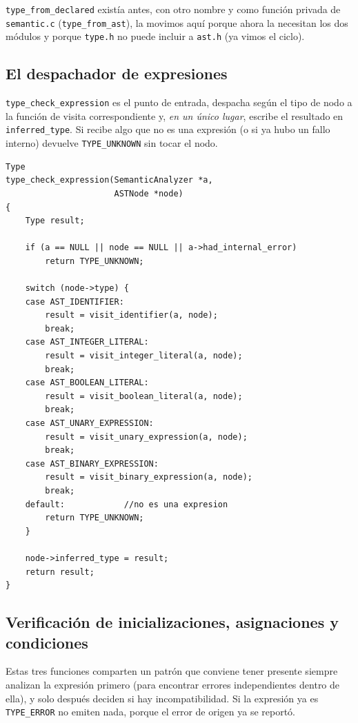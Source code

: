 \documentclass[12pt,letterpaper]{article}
\begin{document}
\bigskip

\texttt{type\_from\_declared} existía antes, con otro nombre y como función privada de \texttt{semantic.c}
(\texttt{type\_from\_ast}), la movimos aquí porque ahora la necesitan los dos módulos y porque \texttt{type.h}
no puede incluir a \texttt{ast.h} (ya vimos el ciclo).

\subsection*{El despachador de expresiones}

\texttt{type\_check\_expression} es el punto de entrada, despacha según el tipo de nodo a la función de visita
correspondiente y, \emph{en un único lugar}, escribe el resultado en \texttt{inferred\_type}. Si recibe algo que
no es una expresión (o si ya hubo un fallo interno) devuelve \texttt{TYPE\_UNKNOWN} sin tocar el nodo.

\begin{lstlisting}[style=modernc, caption={\texttt{type\_checker.c}: \texttt{type\_check\_expression}.}]
Type
type_check_expression(SemanticAnalyzer *a,
                      ASTNode *node)
{
    Type result;

    if (a == NULL || node == NULL || a->had_internal_error)
        return TYPE_UNKNOWN;

    switch (node->type) {
    case AST_IDENTIFIER:
        result = visit_identifier(a, node);
        break;
    case AST_INTEGER_LITERAL:
        result = visit_integer_literal(a, node);
        break;
    case AST_BOOLEAN_LITERAL:
        result = visit_boolean_literal(a, node);
        break;
    case AST_UNARY_EXPRESSION:
        result = visit_unary_expression(a, node);
        break;
    case AST_BINARY_EXPRESSION:
        result = visit_binary_expression(a, node);
        break;
    default:            //no es una expresion
        return TYPE_UNKNOWN;
    }

    node->inferred_type = result;
    return result;
}
\end{lstlisting}

\subsection*{Verificación de inicializaciones, asignaciones y condiciones}

Estas tres funciones comparten un patrón que conviene tener presente siempre analizan la expresión
primero (para encontrar errores independientes dentro de ella), y solo después deciden si hay incompatibilidad.
Si la expresión ya es \texttt{TYPE\_ERROR} no emiten nada, porque el error de origen ya se reportó.
\end{document}
